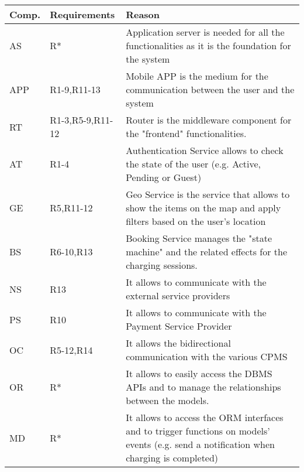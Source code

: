 \begin{tabular}{|p{1.5cm}|p{3cm}|p{10cm}|}
	\hline
	\bf{Comp.} & \bf{Requirements} & \bf{Reason} \\
	\hline
	\hline
	AS & R* & Application server is needed for all the functionalities as it is the foundation for the system\\
	\hline
	APP & R1-9,R11-13 & Mobile APP is the medium for the communication between the user and the system \\
	\hline
	RT & R1-3,R5-9,R11-12 & Router is the middleware component for the "frontend" functionalities.\\
	\hline
	AT & R1-4 & Authentication Service allows to check the state of the user (e.g. Active, Pending or Guest)\\
	\hline
	GE & R5,R11-12 & Geo Service is the service that allows to show the items on the map and apply filters based on the user's location\\
	\hline
	BS & R6-10,R13 & Booking Service manages the "state machine" and the related effects for the charging sessions.\\
	\hline
	NS & R13 & It allows to communicate with the external service providers\\
	\hline
	PS & R10 & It allows to communicate with the Payment Service Provider\\
	\hline
	OC & R5-12,R14 & It allows the bidirectional communication with the various CPMS\\
	\hline
	OR & R* & It allows to easily access the DBMS APIs and to manage the relationships between the models.\\
	\hline
	MD & R* & It allows to access the ORM interfaces and to trigger functions on models' events (e.g. send a notification when charging is completed) \\
	\hline
\end{tabular}





















